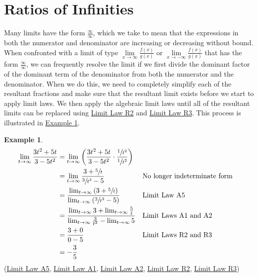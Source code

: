 \documentclass[10pt,oneside,]{book}
\theoremstyle{plain}
\theoremstyle{definition}
\newtheorem{example}[theorem]{Example}
\numberwithin{equation}{section}
\newcommand{\fe}[2]{#1\mathopen{}\left(#2\right)\mathclose{}}
\begin{document}
\section[Ratios of Infinities]{Ratios of Infinities}\label{section-ratios-of-infinities}
Many limits have the form \(\frac{\infty}{\infty}\), which we take to mean that the expressions in both the numerator and denominator are increasing or decreasing without bound. When confronted with a limit of type \(\lim\limits_{x\to\infty}\frac{\fe{f}{x}}{\fe{g}{x}}\) or \(\lim\limits_{x\to-\infty}\frac{\fe{f}{x}}{\fe{g}{x}}\) that has the form \(\frac{\infty}{\infty}\), we can frequently resolve the limit if we first divide the dominant factor of the dominant term of the denominator from both the numerator and the denominator. When we do this, we need to completely simplify each of the resultant fractions and make sure that the resultant limit exists before we start to apply limit laws. We then apply the algebraic limit laws until all of the resultant limits can be replaced using \hyperref[llr2]{Limit Law R2} and \hyperref[llr3]{Limit Law R3}. This process is illustrated in \hyperref[example-ratio-of-infinities]{Example \ref{example-ratio-of-infinities}}.%
\begin{example}\label{example-ratio-of-infinities}
\begin{align*}
\lim_{t\to\infty}\frac{3t^2+5t}{3-5t^2}&=\lim_{t\to\infty}\left(\frac{3t^2+5t}{3-5t^2}\cdot\frac{\sfrac{1}{t^2}}{\sfrac{1}{t^2}}\right)\\
&=\lim_{t\to\infty}\frac{3+\sfrac{5}{t}}{\sfrac{3}{t^2}-5}&&\text{No longer indeterminate form}\\
&=\frac{\lim_{t\to\infty}\left(3+\sfrac{5}{t}\right)}{\lim_{t\to\infty}\left(\sfrac{3}{t^2}-5\right)}&&\text{Limit Law A5}\\
&=\frac{\lim_{t\to\infty}3+\lim_{t\to\infty}\frac{5}{t}}{\lim_{t\to\infty}\frac{3}{t^2}-\lim_{t\to\infty}5}&&\text{Limit Laws A1 and A2}\\
&=\frac{3+0}{0-5}&&\text{Limit Laws R2 and R3}\\
&=-\frac{3}{5}
\end{align*}(\hyperref[lla5]{Limit Law A5}, \hyperref[lla1]{Limit Law A1}, \hyperref[lla2]{Limit Law A2}, \hyperref[llr2]{Limit Law R2}, \hyperref[llr3]{Limit Law R3})%
\end{example}
\typeout{************************************************}
\typeout{************************************************}
\end{document}

